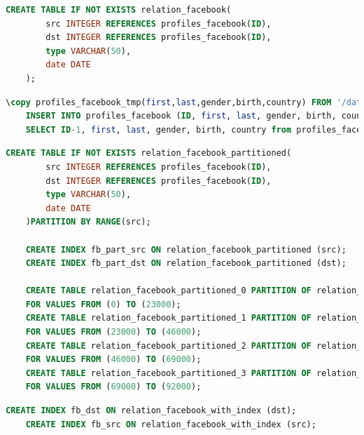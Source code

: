 \begin{lstlisting}[language=SQL,caption=Anlegen der Tabelle facebook-relation,frame=single, label={relationFacebook}]
    CREATE TABLE IF NOT EXISTS relation_facebook(
        src INTEGER REFERENCES profiles_facebook(ID),
        dst INTEGER REFERENCES profiles_facebook(ID),
        type VARCHAR(50),
        date DATE
    );
\end{lstlisting}

\begin{lstlisting}[language=SQL,caption=Hinzufügen von Fremdschlüsseln,frame=single, label={foreignKey}]
    \copy profiles_facebook_tmp(first,last,gender,birth,country) FROM '/data/WS2018/facebook-profiles' DELIMITER ',' CSV HEADER;
    INSERT INTO profiles_facebook (ID, first, last, gender, birth, country)
    SELECT ID-1, first, last, gender, birth, country from profiles_facebook_tmp;
\end{lstlisting}

\begin{lstlisting}[language=SQL,caption=Erstellen von partitionierten Tabellen mit Index facebook,frame=single, label={parttableindexfacebook}]
    CREATE TABLE IF NOT EXISTS relation_facebook_partitioned(
        src INTEGER REFERENCES profiles_facebook(ID),
        dst INTEGER REFERENCES profiles_facebook(ID),
        type VARCHAR(50),
        date DATE
    )PARTITION BY RANGE(src);

    CREATE INDEX fb_part_src ON relation_facebook_partitioned (src);
    CREATE INDEX fb_part_dst ON relation_facebook_partitioned (dst);

    CREATE TABLE relation_facebook_partitioned_0 PARTITION OF relation_facebook_partitioned
    FOR VALUES FROM (0) TO (23000);
    CREATE TABLE relation_facebook_partitioned_1 PARTITION OF relation_facebook_partitioned
    FOR VALUES FROM (23000) TO (46000);
    CREATE TABLE relation_facebook_partitioned_2 PARTITION OF relation_facebook_partitioned
    FOR VALUES FROM (46000) TO (69000);
    CREATE TABLE relation_facebook_partitioned_3 PARTITION OF relation_facebook_partitioned
    FOR VALUES FROM (69000) TO (92000);
\end{lstlisting}

\begin{lstlisting}[language=SQL,caption=Erstellen von Indexen auf relation Tabelle facebook,frame=single, label={indexfacebook}]
    CREATE INDEX fb_dst ON relation_facebook_with_index (dst);
    CREATE INDEX fb_src ON relation_facebook_with_index (src);
\end{lstlisting}

